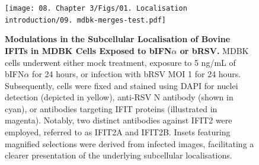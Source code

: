 \begin{figure}
    \centering
    \texttt{[image: 08. Chapter 3/Figs/01. Localisation introduction/09. mdbk-merges-test.pdf]}
    \caption[Modulations in the Subcellular Localisation of Bovine IFITs in MDBK Cells Exposed to bIFN\(\alpha\) or bRSV.]{\textbf{Modulations in the Subcellular Localisation of Bovine IFITs in MDBK Cells Exposed to bIFN\(\alpha\) or bRSV.} MDBK cells underwent either mock treatment, exposure to 5 ng/mL of bIFN\(\alpha\) for 24 hours, or infection with bRSV MOI 1 for 24 hours. Subsequently, cells were fixed and stained using DAPI for nuclei detection (depicted in yellow), anti-RSV N antibody (shown in cyan), or antibodies targeting IFIT proteins (illustrated in magenta). Notably, two distinct antibodies against IFIT2 were employed, referred to as IFIT2A and IFIT2B. Insets featuring magnified selections were derived from infected images, facilitating a clearer presentation of the underlying subcellular localisations.}
    \label{fig:Modulations in the Subcellular Localisation of Bovine IFITs in MDBK Cells Exposed to bIFNa or bRSV}
\end{figure}

